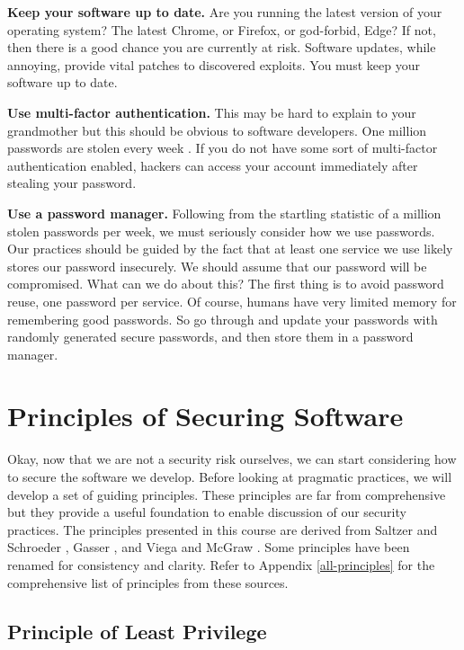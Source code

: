 \textbf{Keep your software up to date.}
Are you running the latest version of your operating system?
The latest Chrome, or Firefox, or god-forbid, Edge?
If not, then there is a good chance you are currently at risk.
Software updates, while annoying, provide vital patches to discovered exploits.
You must keep your software up to date.

\textbf{Use multi-factor authentication.}
This may be hard to explain to your grandmother but this should be obvious to software developers.
One million passwords are stolen every week \cite{password-security}.
If you do not have some sort of multi-factor authentication enabled, hackers can access your account immediately after stealing your password.

\textbf{Use a password manager.}
Following from the startling statistic of a million stolen passwords per week, we must seriously consider how we use passwords.
Our practices should be guided by the fact that at least one service we use likely stores our password insecurely.
We should assume that our password will be compromised.
What can we do about this?
The first thing is to avoid password reuse, one password per service.
Of course, humans have very limited memory for remembering good passwords.
So go through and update your passwords with randomly generated secure passwords, and then store them in a password manager.


\section{Principles of Securing Software}
Okay, now that we are not a security risk ourselves, we can start considering how to secure the software we develop.
Before looking at pragmatic practices, we will develop a set of guiding principles.
These principles are far from comprehensive but they provide a useful foundation to enable discussion of our security practices.
The principles presented in this course are derived from Saltzer and Schroeder \cite{1975-security-design-principles},
Gasser \cite{1988-security-design-principles}, and Viega and McGraw \cite{2001-security-design-principles}.
Some principles have been renamed for consistency and clarity.
Refer to Appendix \ref{all-principles} for the comprehensive list of principles from these sources. 

\subsection{Principle of Least Privilege}

